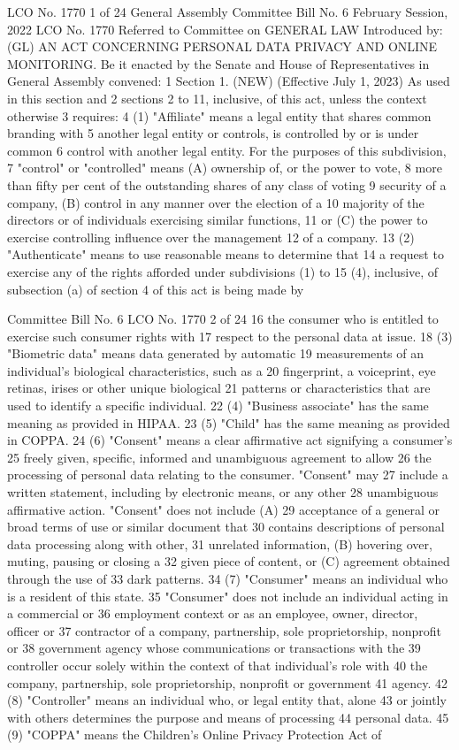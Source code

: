 LCO No. 1770 1 of 24
General Assembly Committee Bill No. 6
February Session, 2022 LCO No. 1770
Referred to Committee on GENERAL LAW
Introduced by:
(GL)
AN ACT CONCERNING PERSONAL DATA PRIVACY AND ONLINE
MONITORING.
Be it enacted by the Senate and House of Representatives in General
Assembly convened:
1 Section 1. (NEW) (Effective July 1, 2023) As used in this section and
2 sections 2 to 11, inclusive, of this act, unless the context otherwise
3 requires:
4 (1) "Affiliate" means a legal entity that shares common branding with
5 another legal entity or controls, is controlled by or is under common
6 control with another legal entity. For the purposes of this subdivision,
7 "control" or "controlled" means (A) ownership of, or the power to vote,
8 more than fifty per cent of the outstanding shares of any class of voting
9 security of a company, (B) control in any manner over the election of a
10 majority of the directors or of individuals exercising similar functions,
11 or (C) the power to exercise controlling influence over the management
12 of a company.
13 (2) "Authenticate" means to use reasonable means to determine that
14 a request to exercise any of the rights afforded under subdivisions (1) to
15 (4), inclusive, of subsection (a) of section 4 of this act is being made by

Committee Bill No. 6
LCO No. 1770 2 of 24
16 the consumer who is entitled to exercise such consumer rights with
17 respect to the personal data at issue.
18 (3) "Biometric data" means data generated by automatic
19 measurements of an individual's biological characteristics, such as a
20 fingerprint, a voiceprint, eye retinas, irises or other unique biological
21 patterns or characteristics that are used to identify a specific individual.
22 (4) "Business associate" has the same meaning as provided in HIPAA.
23 (5) "Child" has the same meaning as provided in COPPA.
24 (6) "Consent" means a clear affirmative act signifying a consumer's
25 freely given, specific, informed and unambiguous agreement to allow
26 the processing of personal data relating to the consumer. "Consent" may
27 include a written statement, including by electronic means, or any other
28 unambiguous affirmative action. "Consent" does not include (A)
29 acceptance of a general or broad terms of use or similar document that
30 contains descriptions of personal data processing along with other,
31 unrelated information, (B) hovering over, muting, pausing or closing a
32 given piece of content, or (C) agreement obtained through the use of
33 dark patterns.
34 (7) "Consumer" means an individual who is a resident of this state.
35 "Consumer" does not include an individual acting in a commercial or
36 employment context or as an employee, owner, director, officer or
37 contractor of a company, partnership, sole proprietorship, nonprofit or
38 government agency whose communications or transactions with the
39 controller occur solely within the context of that individual's role with
40 the company, partnership, sole proprietorship, nonprofit or government
41 agency.
42 (8) "Controller" means an individual who, or legal entity that, alone
43 or jointly with others determines the purpose and means of processing
44 personal data.
45 (9) "COPPA" means the Children's Online Privacy Protection Act of 

